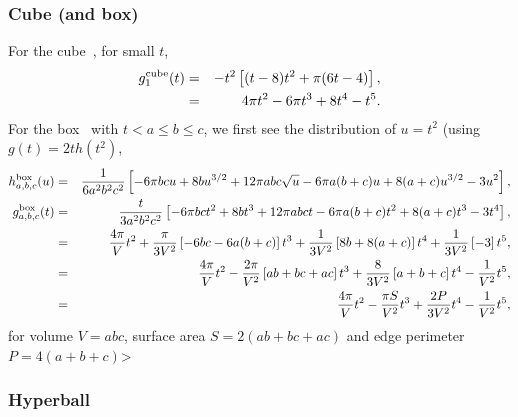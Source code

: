 \documentclass{article}
\begin{document}
\subsubsection{Cube (and box)}
For the cube~\cite{weisstein:_cube_line_picking}, for small $t$,
\begin{eqnarray}
  g^{\rm cube}_{1}(t) & = &  -t^2 \left[ (t-8)t^2 + \pi (6 t - 4) \right], \nonumber \\
                    & = & 4 \pi t^2 - 6 \pi t^3 + 8 t^4 - t^5.
\end{eqnarray}
For the box~\cite{philip:_probab_distr_distan_between_two} with $t < a
\leq b \leq c$, we first see the distribution  of $u=t^2$ (using $g(t)
= 2 t h(t^2)$, 
\begin{eqnarray}
  h^{\rm box}_{a,b,c}(u) & = &
  \frac{1}{6 a^2 b^2 c^2} \left[
    - 6 \pi b c u + 8 b u^{3/2}
    +12 \pi a b c \sqrt u - 6 \pi a(b + c)u + 8(a + c) u^{3/2} - 3 u^2
    \right], \nonumber \\
  g^{\rm box}_{a,b,c}(t)  & = &
  \frac{t }{3 a^2 b^2 c^2} \left[
    - 6 \pi b c t^2 + 8 b t^{3}
    +12 \pi a b c t - 6 \pi a(b + c)t^2 + 8(a + c) t^{3} - 3 t^4
    \right], \nonumber \\
 & = & \frac{4 \pi}{V} t^2
       + \frac{\pi }{3 V^2} \left[ -6 b c - 6 a (b+c) \right] t^3
       + \frac{1}{3 V^2} \left[ 8 b + 8 (a+c) \right] t^4
       + \frac{1}{3 V^2} \left[ - 3 \right] t^5, \nonumber \\
 & = & \frac{4 \pi}{V} t^2
       - \frac{2 \pi }{ V^2} \left[ a b + bc + a c \right] t^3
       + \frac{8}{3 V^2} \left[ a + b + c \right] t^4
       - \frac{1}{V^2} t^5,  \nonumber \\
 & = & \frac{4 \pi}{V} t^2
       - \frac{\pi S}{ V^2} t^3
       + \frac{2 P}{3 V^2}  t^4
       - \frac{1}{V^2} t^5, 
\end{eqnarray}
for volume $V = a b c$, surface area $S = 2(a b + bc + a c)$ and edge
perimeter $P = 4(a + b + c)$>


\subsubsection{Hyperball}
\end{document}
